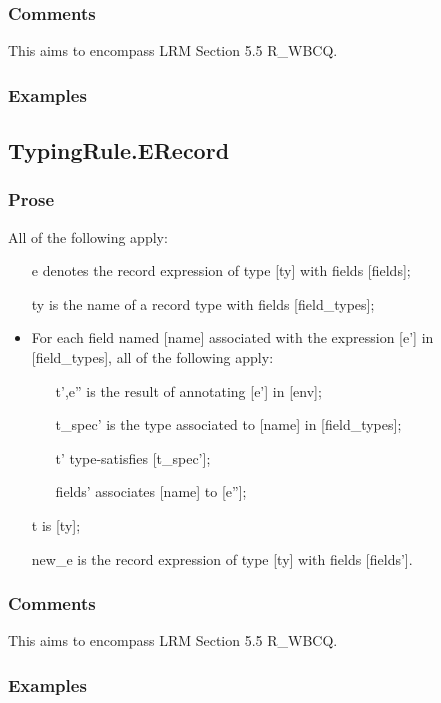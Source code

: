 \documentclass{book}
\begin{document}
  \subsubsection{Comments}
  This aims to encompass LRM Section 5.5 R\_WBCQ.

  \subsubsection{Examples}

\subsection{TypingRule.ERecord}

  \subsubsection{Prose}
  All of the following apply:
  \begin{itemize}
  \item  [e] denotes the record expression of type [ty] with fields [fields];
  \item  [ty] is the name of a record type with fields [field\_types];
  \item  For each field named [name] associated with the expression [e'] in
    [field\_types], all of the following apply:
    \begin{itemize}
    \item  [t',e''] is the result of annotating [e'] in [env];
    \item  [t\_spec'] is the type associated to [name] in [field\_types];
    \item  [t'] type-satisfies [t\_spec'];
    \item  [fields'] associates [name] to [e''];
    \end{itemize}
  \item  [t] is [ty];
  \item  [new\_e] is the record expression of type [ty] with fields [fields'].
  \end{itemize}

  \subsubsection{Comments}
  This aims to encompass LRM Section 5.5 R\_WBCQ.

  \subsubsection{Examples}
\end{document}
